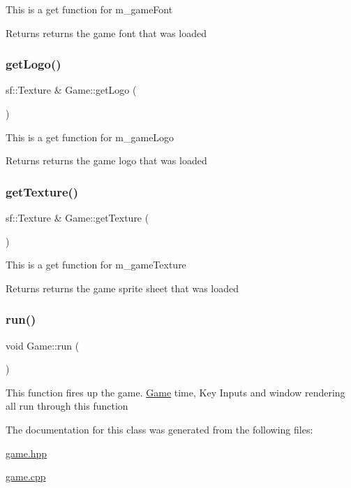 This is a get function for m\+\_\+game\+Font

\begin{DoxyReturn}{Returns}
returns the game font that was loaded 
\end{DoxyReturn}
\mbox{\label{class_game_a4eb607b287a0aa0238339454399edc8b}} 
\subsubsection{\texorpdfstring{get\+Logo()}{getLogo()}}
{\footnotesize\ttfamily sf\+::\+Texture \& Game\+::get\+Logo (\begin{DoxyParamCaption}{ }\end{DoxyParamCaption})}

This is a get function for m\+\_\+game\+Logo

\begin{DoxyReturn}{Returns}
returns the game logo that was loaded 
\end{DoxyReturn}
\mbox{\label{class_game_aa231abe1d7a36b55599ca459c815b2a5}} 
\subsubsection{\texorpdfstring{get\+Texture()}{getTexture()}}
{\footnotesize\ttfamily sf\+::\+Texture \& Game\+::get\+Texture (\begin{DoxyParamCaption}{ }\end{DoxyParamCaption})}

This is a get function for m\+\_\+game\+Texture

\begin{DoxyReturn}{Returns}
returns the game sprite sheet that was loaded 
\end{DoxyReturn}
\mbox{\label{class_game_a1ab78f5ed0d5ea879157357cf2fb2afa}} 
\subsubsection{\texorpdfstring{run()}{run()}}
{\footnotesize\ttfamily void Game\+::run (\begin{DoxyParamCaption}{ }\end{DoxyParamCaption})}

This function fires up the game. \hyperlink{class_game}{Game} time, Key Inputs and window rendering all run through this function 

The documentation for this class was generated from the following files\+:\begin{DoxyCompactItemize}
\item 
\hyperlink{game_8hpp}{game.\+hpp}\item 
\hyperlink{game_8cpp}{game.\+cpp}\end{DoxyCompactItemize}
